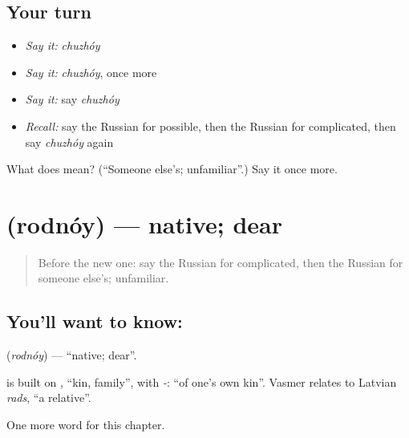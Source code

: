 \subsection*{Your turn}
\begin{itemize}
\raggedright
  \item \emph{Say it:} \emph{chuzhóy}
  \item \emph{Say it:} \emph{chuzhóy}, once more
  \item \emph{Say it:} say \emph{chuzhóy}
  \item \emph{Recall:} say the Russian for possible, then the Russian for complicated, then say \emph{chuzhóy} again
\end{itemize}

\begin{tcolorbox}[breakable,colback=teal!4,colframe=teal!35!black,title={Before you move on}]
What does  mean? (\textquotedblleft{}Someone else's; unfamiliar\textquotedblright{}.) Say it once more.
\end{tcolorbox}
\section[\texorpdfstring{\ru{родной} (rodnóy)}{родной (rodnóy)}]{ (rodnóy) — native; dear}

\label{lesson:RU-C189-rodnoy}



\begin{quote}
Before the new one: say the Russian for complicated, then the Russian for someone else's; unfamiliar.
\end{quote}

\subsection*{You'll want to know: }
\textbf{} (\emph{rodnóy}) — \textquotedblleft{}native; dear\textquotedblright{}.

\begin{cousinweb}
\textbf{} is built on \emph{}, \textquotedblleft{}kin, family\textquotedblright{}, with \emph{-}: \textquotedblleft{}of one's own kin\textquotedblright{}. Vasmer relates \emph{} to Latvian \emph{rads}, \textquotedblleft{}a relative\textquotedblright{}.
\end{cousinweb}

\begin{grammarlens}[title={What you've built}]
One more word for this chapter.
\end{grammarlens}

